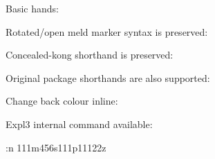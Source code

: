 \documentclass{article}
\begin{document}
Basic hands:




Rotated/open meld marker syntax is preserved:


Concealed-kong shorthand is preserved:


Original package shorthands are also supported:


Change back colour inline:


Expl3 internal command available:\par
\ExplSyntaxOn
\mahjong:n {111m456s111p11122z}
\ExplSyntaxOff
\end{document}
